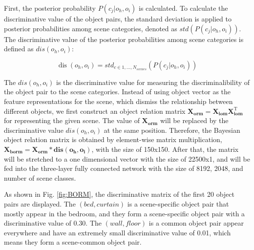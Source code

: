 \documentclass[letterpaper, 10 pt, conference]{ieeeconf}  %
\begin{document}




First, the posterior probability $P(c_j|o_h, o_i)$ is calculated. To calculate the discriminative value of the object pairs, the standard deviation is applied to posterior probabilities among scene categories, denoted as $std(P(c_j|o_h, o_i))$. The discriminative value of the posterior probabilities among scene categories is defined as $dis(o_h, o_i)$:


\begin{equation}
\operatorname{dis}\left(o_{h}, o_{i} \right)= std _{c \in 1, \ldots, N_{scenes}}(P(c_j|o_h, o_i))
\end{equation}

The $dis(o_h, o_i)$ is the discriminative value for measuring the discriminalibility of the object pair to the scene categories. Instead of using object vector as the feature representations for the scene, which dismiss the relationship between different objects, we first construct an object relation matrix $\mathbf{X_{orm}}=\mathbf{X_{iom}} \mathbf{X_{iom}^\mathrm{T}}$ for representing the given scene. The value of $\mathbf{X_{orm}}$ will be replaced by the discriminative value $dis(o_h, o_i)$ at the same position. Therefore, the Bayesian object relation matrix is obtained by element-wise matrix multiplication, $\mathbf{X_{borm}}=\mathbf{X_{orm}}*\mathbf{dis(o_h, o_i)}$, with the size of 150x150. After that, the matrix will be stretched to a one dimensional vector with the size of 22500x1, and will be fed into the three-layer fully connected network with the size of 8192, 2048, and number of scene classes. 



As shown in Fig. \ref{fig:BORM}, the discriminative matrix of the first 20 object pairs are displayed. The $(bed,curtain)$ is a scene-specific object pair that mostly appear in the bedroom, and they form a scene-specific object pair with a discriminative value of 0.30. The $(wall, floor)$ is a common object pair appear everywhere and have an extremely small discriminative value of 0.01, which means they form a scene-common object pair. 
\end{document}
